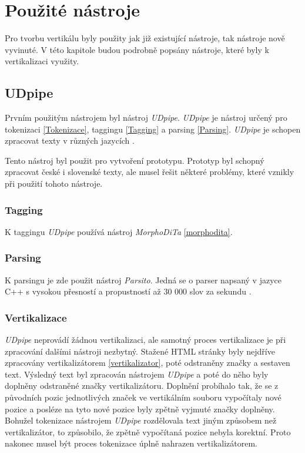 \section{Použité nástroje}
Pro tvorbu vertikálu byly použity jak již existující nástroje, tak nástroje nově vyvinuté. V této kapitole
budou podrobně popsány nástroje, které byly k vertikalizaci využity.

\subsection{UDpipe}
Prvním použitým nástrojem byl nástroj \textit{UDpipe}. \textit{UDpipe} je nástroj určený pro tokenizaci \ref{Tokenizace},
taggingu \ref{Tagging} a parsing \ref{Parsing}. \textit{UDpipe} je schopen zpracovat texty v různých jazycích \cite{UDPIPE}.

Tento nástroj byl použit pro vytvoření prototypu. Prototyp byl schopný zpracovat české i slovenské texty, ale musel
řešit některé problémy, které vznikly při použití tohoto nástroje.

\subsubsection{Tagging}
K taggingu \textit{UDpipe} používá nástroj \textit{MorphoDiTa} \ref{morphodita}.

\subsubsection{Parsing}
K parsingu je zde použit nástroj \textit{Parsito}. Jedná se o parser napsaný v jazyce C++ s vysokou přesností
a propustností až 30 000 slov za sekundu \cite{PARSITO}.

\subsubsection{Vertikalizace}
\textit{UDpipe} neprovádí žádnou vertikalizaci, ale samotný proces vertikalizace je při zpracování dalšími nástroji
nezbytný. Stažené HTML stránky byly nejdříve zpracovány vertikalizátorem \ref{vertikalizator}, poté odstraněny
značky a sestaven text. Výsledný text byl zpracován nástrojem \textit{UDpipe} a poté do něho byly doplněny
odstraněné značky vertikalizátoru. Doplnění probíhalo tak, že se z původních pozic jednotlivých značek ve vertikálním
souboru vypočítaly nové pozice a posléze na tyto nové pozice byly zpětně vyjmuté značky doplněny. Bohužel tokenizace nástrojem \textit{UDpipe} rozdělovala text
jiným způsobem než vertikalizátor, to způsobilo, že zpětně vypočítaná pozice nebyla korektní. Proto nakonec musel být
proces tokenizace úplně nahrazen vertikalizátorem.

